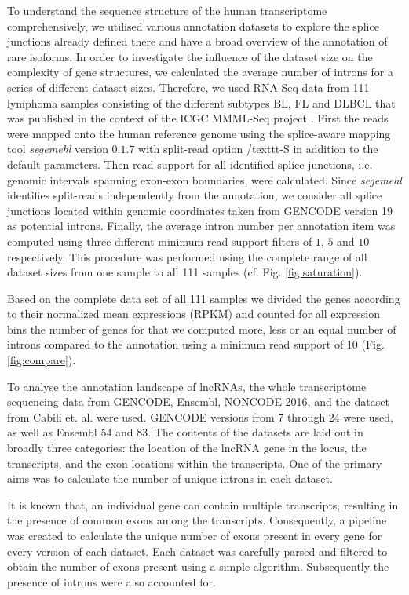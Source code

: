 \documentclass[ncrna,article,submit,moreauthors,pdftex,10pt,a4paper]{mdpi}
\begin{document}
To understand the sequence structure of the human transcriptome comprehensively, we utilised various annotation datasets to explore the splice junctions already defined there and have a broad overview of the annotation of rare isoforms.
In order to investigate the influence of the dataset size on the complexity of gene structures, we calculated the average number of introns for a series of different dataset sizes.
Therefore, we used RNA-Seq data from 111 lymphoma samples  consisting of the different subtypes BL, FL and DLBCL that was published in the context of the ICGC MMML-Seq project \citep{Richter2012-un}.
First the reads were mapped onto the human reference genome using the splice-aware mapping tool \textit{segemehl} version $0.1.7$ \citep{hoffmann2009,Hoffmann:14a} with split-read option  /texttt{-S} in addition to the default parameters. Then read support for all identified splice junctions, i.e. genomic intervals spanning exon-exon boundaries, were calculated. Since \textit{segemehl} identifies split-reads independently from the annotation, we consider all splice junctions located within genomic coordinates taken from GENCODE version 19 as potential introns. Finally, the average intron number per annotation item was computed using three different minimum read support filters of $1$, $5$ and $10$ respectively.
This procedure was performed using the complete range of all dataset sizes from one sample to all 111 samples (cf. Fig. \ref{fig:saturation}).

Based on the complete data set of all 111 samples we divided the genes according to their normalized mean expressions (RPKM) and counted for all expression bins the number of genes for that we computed more, less or an equal number of introns compared to the annotation using a minimum read support of 10 (Fig. \ref{fig:compare}). 

To analyse the annotation landscape of lncRNAs, the whole transcriptome sequencing data from GENCODE, Ensembl, NONCODE 2016, 
and the dataset from Cabili et. al. were used. GENCODE versions from 7 through 24 were used, as well as Ensembl 54 and 83.
The contents of the datasets are laid out in broadly three categories: the location of the lncRNA gene in the locus, 
the transcripts, and the exon locations within the transcripts. One of the primary aims was to calculate
the number of unique introns in each dataset. 

It is known that, an individual gene can contain multiple transcripts, resulting in the presence of common exons among the transcripts.
 Consequently, a pipeline was created to calculate the unique number of exons present in every gene for every version of each dataset. 
 Each dataset was carefully parsed and filtered to obtain the number of exons present using a simple algorithm. Subsequently the presence of introns were also accounted for.
 
\end{document}

